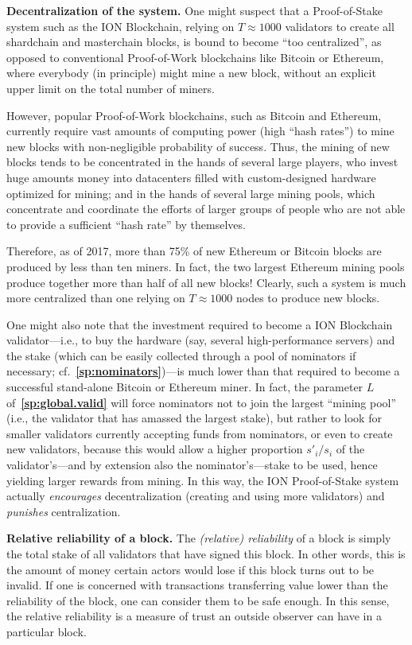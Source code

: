\documentclass[12pt,oneside]{article}
\def\makepoint#1{\medbreak\noindent{\bf #1.\ }}
\def\nxsubpoint{\refstepcounter{subsubsection}%
  \smallbreak\makepoint{\thesubsubsection}}
\def\refpoint#1{{\rm\textbf{\ref{#1}}}}
\let\ptref=\refpoint
\def\embt(#1.){\textbf{#1.}}
\begin{document}
\nxsubpoint \embt(Decentralization of the system.)  One might suspect
that a Proof-of-Stake system such as the ION Blockchain, relying on
$T\approx1000$ validators to create all shardchain and masterchain
blocks, is bound to become ``too centralized'', as opposed to
conventional Proof-of-Work blockchains like Bitcoin or Ethereum, where
everybody (in principle) might mine a new block, without an explicit
upper limit on the total number of miners.

However, popular Proof-of-Work blockchains, such as Bitcoin and
Ether\-eum, currently require vast amounts of computing power (high
``hash rates'') to mine new blocks with non-negligible probability of
success. Thus, the mining of new blocks tends to be concentrated in the
hands of several large players, who invest huge amounts money into
datacenters filled with custom-designed hardware optimized for mining;
and in the hands of several large mining pools, which concentrate and
coordinate the efforts of larger groups of people who are not able to
provide a sufficient ``hash rate'' by themselves.

Therefore, as of 2017, more than 75\% of new Ethereum or Bitcoin
blocks are produced by less than ten miners. In fact, the two largest
Ethereum mining pools produce together more than half of all new
blocks! Clearly, such a system is much more centralized than one
relying on $T\approx1000$ nodes to produce new blocks.

One might also note that the investment required to become a ION
Blockchain validator---i.e., to buy the hardware (say, several
high-performance servers) and the stake (which can be easily collected
through a pool of nominators if necessary;
cf.~\ptref{sp:nominators})---is much lower than that required to
become a successful stand-alone Bitcoin or Ethereum miner. In fact,
the parameter $L$ of~\ptref{sp:global.valid} will force nominators not
to join the largest ``mining pool'' (i.e., the validator that has
amassed the largest stake), but rather to look for smaller validators
currently accepting funds from nominators, or even to create new
validators, because this would allow a higher proportion $s'_i/s_i$ of
the validator's---and by extension also the nominator's---stake to be
used, hence yielding larger rewards from mining. In this way, the ION
Proof-of-Stake system actually {\em encourages\/} decentralization
(creating and using more validators) and {\em punishes\/}
centralization.

\nxsubpoint\label{sp:rel.rel} \embt(Relative reliability of a block.)
The {\em (relative) reliability\/} of a block is simply the total
stake of all validators that have signed this block. In other words,
this is the amount of money certain actors would lose if this block
turns out to be invalid. If one is concerned with transactions
transferring value lower than the reliability of the block, one can
consider them to be safe enough. In this sense, the relative
reliability is a measure of trust an outside observer can have in a
particular block.
\end{document}
